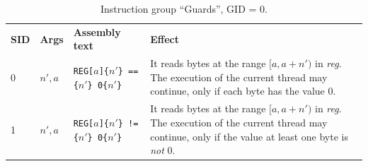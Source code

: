 \documentclass[10pt,twocolumn]{article}
\begin{document}
\clearpage



\begin{table}[!h]
\begin{center}
\def\arraystretch{1.5}
\begin{tabular}{lp{1.2cm}p{5.5cm}p{7.5cm}}
\textbf{SID} & \textbf{Args} & \textbf{Assembly text} & \textbf{Effect}
\\

0 & $ n',a $ %
& \texttt{REG[}$ a $\texttt{]\{}$ n' $\texttt{\} ==\{}$ n' $\texttt{\} 0\{}$
n' $\texttt{\}} %
& It reads bytes at the range $ [a,a+n') $ in \textit{reg}. The execution of the
current thread may continue, only if each byte has the value 0. \\

1 & $ n',a $ %
& \texttt{REG[}$ a $\texttt{]\{}$ n' $\texttt{\} !=\{}$ n' $\texttt{\} 0\{}$
n' $\texttt{\}} %
& It reads bytes at the range $ [a,a+n') $ in \textit{reg}. The execution of the
current thread may continue, only if the value at least one byte is \emph{not} 0. \\



\end{tabular}
\end{center}
\caption{Instruction group ``Guards'', GID = 0.}
\label{tab:igroup:guards}
\end{table}


\end{document}
